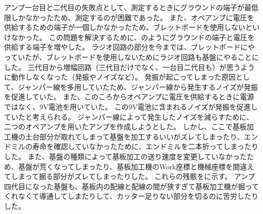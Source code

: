 \documentclass[report.tex]{subfiles}
\begin{document}
アンプ一台目と二代目の失敗点として、測定するときにグラウンドの端子が最低限しかなかったため、測定するのが困難であった。
また、オペアンプに電圧を供給するための端子が一個しかなかったため、ブレットボードを使用しないといけなかった。
この問題を解決するために、のようにグラウンドの端子と電圧を供給する端子を増やした。
ラジオ回路の部分を今までは、ブレットボードにやっていたが、ブレットボードを使用しないためにラジオ回路も基盤にやることにした。
三代目から増幅回路（三代目だけでなく、一台目二代目も）が思うように動作しなくなった（発振やノイズなど）。
発振が起こってしまった原因として、ジャンパー線を多用していたため、ジャンパー線から発生するノイズが発振を促進していた。
また、このころからオペアンプに電圧を供給するときに電源ではなく、9V電池を用いていた。
この9V電池に含まれるノイズが発振を促進していたと考えられる。
ジャンパー線によって発生したノイズを減らすために、二つのオペアンプを用いたアンプを作成しようとした。
しかし、ここで基板加工機の土台部分が取れてしまって基盤を加工するいいがズレてしまったり、エンドミルの寿命を確認していなかったために、エンドミルを二本折ってしまったりした。
また、基盤の種類によって基板加工の送り速度を変更していなかったため、基盤が荒くなってしまったり、基板加工機のWork座標と機械座標を間違えてしまって掘る部分がズレてしまったりした。
これらの残骸をに示す。
アンプ四代目になった基盤も、基板内の配線と配線の間が狭すぎて基板加工機が掘ってくれなくて導通してしまたりして、カッター足りない部分を切るのに苦労したりした。
\end{document}
